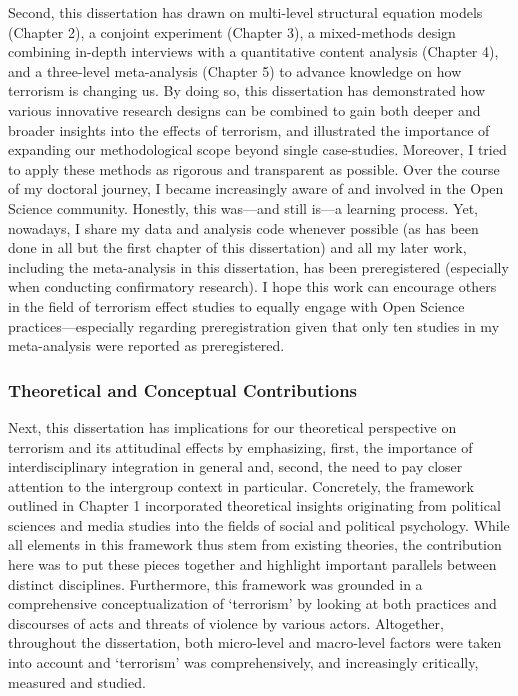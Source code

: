 Second, this dissertation has drawn on multi-level structural equation models (Chapter 2), a conjoint experiment (Chapter 3), a mixed-methods design combining in-depth interviews with a quantitative content analysis (Chapter 4), and a three-level meta-analysis (Chapter 5) to advance knowledge on how terrorism is changing us. By doing so, this dissertation has demonstrated how various innovative research designs can be combined to gain both deeper and broader insights into the effects of terrorism, and illustrated the importance of expanding our methodological scope beyond single case-studies. Moreover, I tried to apply these methods as rigorous and transparent as possible. Over the course of my doctoral journey, I became increasingly aware of and involved in the Open Science community. Honestly, this was---and still is---a learning process. Yet, nowadays, I share my data and analysis code whenever possible (as has been done in all but the first chapter of this dissertation) and all my later work, including the meta-analysis in this dissertation, has been preregistered (especially when conducting confirmatory research). I hope this work can encourage others in the field of terrorism effect studies to equally engage with Open Science practices---especially regarding preregistration given that only ten studies in my meta-analysis were reported as preregistered.


\subsubsection{Theoretical and Conceptual Contributions}
Next, this dissertation has implications for our theoretical perspective on terrorism and its attitudinal effects by emphasizing, first, the importance of interdisciplinary integration in general and, second, the need to pay closer attention to the intergroup context in particular. Concretely, the framework outlined in Chapter 1 incorporated theoretical insights originating from political sciences and media studies into the fields of social and political psychology. While all elements in this framework thus stem from existing theories, the contribution here was to put these pieces together and highlight important parallels between distinct disciplines. Furthermore, this framework was grounded in a comprehensive conceptualization of `terrorism' by looking at both practices and discourses of acts and threats of violence by various actors. Altogether, throughout the dissertation, both micro-level and macro-level factors were taken into account and `terrorism' was comprehensively, and increasingly critically, measured and studied. 


